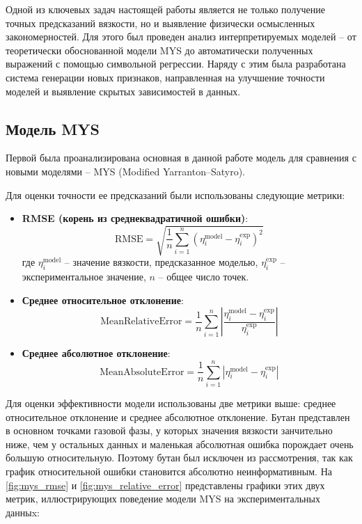 \documentclass[a4paper,12pt]{article}
\begin{document}
  Одной из ключевых задач настоящей работы является не только получение точных предсказаний вязкости, но и выявление физически осмысленных закономерностей. Для этого был проведен анализ интерпретируемых моделей -- от теоретически обоснованной модели MYS до автоматически полученных выражений с помощью символьной регрессии. Наряду с этим была разработана система генерации новых признаков, направленная на улучшение точности моделей и выявление скрытых зависимостей в данных.

  \subsection{Модель MYS}

    Первой была проанализирована основная в данной работе модель для сравнения с новыми моделями -- MYS (Modified Yarranton–Satyro).
    
    Для оценки точности ее предсказаний были использованы следующие метрики:
    
    \begin{itemize}
      \item \textbf{RMSE (корень из среднеквадратичной ошибки)}:
      \begin{equation}
        \mathrm{RMSE} = \sqrt{\frac{1}{n} \sum_{i=1}^{n} \left( \eta_i^{\text{model}} - \eta_i^{\text{exp}} \right)^2}
      \end{equation}
      где \( \eta_i^{\text{model}} \) -- значение вязкости, предсказанное моделью, \( \eta_i^{\text{exp}} \) -- экспериментальное значение, \( n \) -- общее число точек.
    
      \item \textbf{Среднее относительное отклонение}:
      \begin{equation}
        \mathrm{MeanRelativeError} = \frac{1}{n} \sum_{i=1}^{n} \left| \frac{\eta_i^{\text{model}} - \eta_i^{\text{exp}}}{\eta_i^{\text{exp}}} \right|
      \end{equation}

      \item \textbf{Среднее абсолютное отклонение}:
      \begin{equation}
        \mathrm{MeanAbsoluteError} = \frac{1}{n} \sum_{i=1}^{n} \left| \eta_i^{\text{model}} - \eta_i^{\text{exp}} \right|
      \end{equation}
    \end{itemize}
    
    \medskip
    
   Для оценки эффективности модели использованы две метрики выше: среднее относительное отклонение и среднее абсолютное отклонение. Бутан представлен в основном точками газовой фазы, у которых значения вязкости занчительно ниже, чем у остальных данных и маленькая абсолютная ошибка порождает очень большую относительную. Поэтому бутан был исключен из рассмотрения, так как график относительной ошибки становится абсолютно неинформативным. На \autoref{fig:mys_rmse} и \autoref{fig:mys_relative_error} представлены графики этих двух метрик, иллюстрирующих поведение модели MYS на экспериментальных данныx:  
\end{document}
